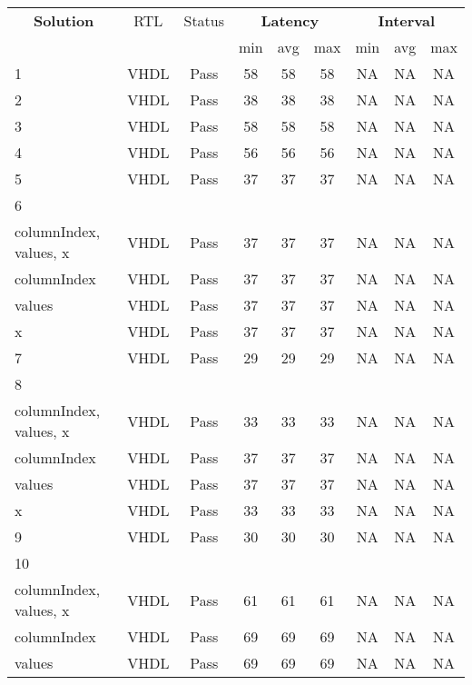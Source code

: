 

\begin{table}[H]
	\centering
	\begin{tabular}{|l|c|c|c|c|c|c|c|c|}
		\hline
		\multicolumn{1}{|c|}{\textbf{Solution}} & \multicolumn{1}{|c|}{RTL} & \multicolumn{1}{|c|}{Status} & \multicolumn{3}{c|}{\textbf{Latency}} & \multicolumn{3}{c|}{\textbf{Interval}} \\
		& &  & min & avg & max & min & avg & max \\
		\hline
		1 & VHDL & Pass & 58 & 58 & 58 & NA & NA & NA \\
		\hline
		2 & VHDL & Pass & 38 & 38 & 38 & NA & NA & NA \\
		\hline
		3 & VHDL & Pass & 58 & 58 & 58 & NA & NA & NA \\
		\hline
		4 & VHDL & Pass & 56 & 56 & 56 & NA & NA & NA \\
		\hline
		5 & VHDL & Pass & 37 & 37 & 37 & NA & NA & NA \\
		\hline
		6 &  &  &  &  &  &  &  &  \\
		\tabitem columnIndex, values, x & VHDL & Pass & 37 & 37 & 37 & NA & NA & NA \\
		\tabitem columnIndex & VHDL & Pass & 37 & 37 & 37 & NA & NA & NA \\
		\tabitem values & VHDL & Pass & 37 & 37 & 37 & NA & NA & NA \\
		\tabitem x & VHDL & Pass & 37 & 37 & 37 & NA & NA & NA \\
		\hline
		7 & VHDL & Pass & 29 & 29 & 29 & NA & NA & NA \\
		\hline
		8 &  &  &  &  &  &  &  &  \\
		\tabitem columnIndex, values, x & VHDL & Pass & 33 & 33 & 33 & NA & NA & NA \\
		\tabitem columnIndex & VHDL & Pass & 37 & 37 & 37 & NA & NA & NA \\
		\tabitem values & VHDL & Pass & 37 & 37 & 37 & NA & NA & NA \\
		\tabitem x & VHDL & Pass & 33 & 33 & 33 & NA & NA & NA \\
		\hline
		9 & VHDL & Pass & 30 & 30 & 30 & NA & NA & NA \\
		\hline
		10 &  &  &  &  &  &  &  &  \\
		\tabitem columnIndex, values, x & VHDL & Pass & 61 & 61 & 61 & NA & NA & NA \\
		\tabitem columnIndex & VHDL & Pass & 69 & 69 & 69 & NA & NA & NA \\
		\tabitem values & VHDL & Pass & 69 & 69 & 69 & NA & NA & NA \\

\end{tabular}
\end{table}
